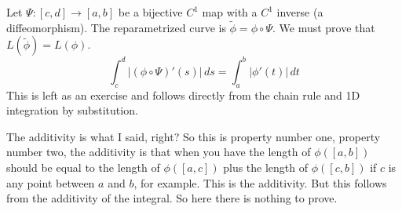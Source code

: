 \begin{math-stroke}
Let $\Psi: [c,d] \to [a,b]$ be a bijective $C^1$ map with a $C^1$ inverse (a diffeomorphism). The reparametrized curve is $\tilde{\phi} = \phi \circ \Psi$. We must prove that $L(\tilde{\phi}) = L(\phi)$.
\[
\int_c^d |(\phi \circ \Psi)'(s)| \, ds = \int_a^b |\phi'(t)| \, dt
\]
This is left as an exercise and follows directly from the chain rule and 1D integration by substitution.
\end{math-stroke}

\begin{spoken-clean}[17:52 - 18:10]
The additivity is what I said, right? So this is property number one, property number two, the additivity is that when you have the length of $\phi([a,b])$ should be equal to the length of $\phi([a,c])$ plus the length of $\phi([c,b])$ if $c$ is any point between $a$ and $b$, for example. This is the additivity. But this follows from the additivity of the integral. So here there is nothing to prove.
\end{spoken-clean}